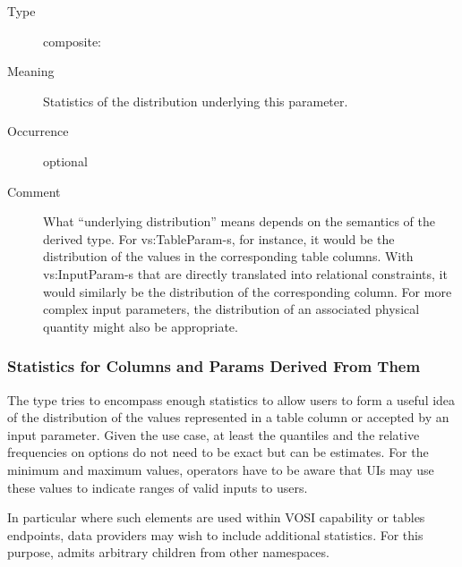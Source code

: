 \documentclass[11pt,a4paper]{ivoa}
\begin{document}
\begin{generated}
\begin{bigdescription}
\begin{description}
\end{description}
\item[Element \xmlel{stats}]
\begin{description}
\item[Type] composite: 
\item[Meaning] Statistics of the distribution underlying this parameter.
\item[Occurrence] optional
\item[Comment] What “underlying distribution” means depends on the
                  semantics of the derived type.  For vs:TableParam-s, for
                  instance, it would be the distribution of the values in
                  the corresponding table columns.  With vs:InputParam-s
                  that are directly translated into relational constraints,
                  it would similarly be the distribution of the corresponding
                  column.  For more complex input parameters, the
                  distribution of an associated physical quantity might also
                  be appropriate.

\end{description}


\end{bigdescription}\endgroup

\endgroup
\end{generated}


\subsubsection{Statistics for Columns and Params Derived From Them}

The  type tries to encompass enough statistics to allow
users to form a useful idea of the distribution of the values
represented in a table column or accepted by an input parameter.  Given
the use case, at least the quantiles and the relative frequencies on
options do not need to be exact but can be estimates.  For the minimum
and maximum values, operators have to be aware that UIs may use these
values to indicate ranges of valid inputs to users.

In
particular where such elements are used within VOSI capability or tables
endpoints, data providers may wish to include additional statistics.
For this purpose,  admits arbitrary children from other
namespaces.
\end{document}
